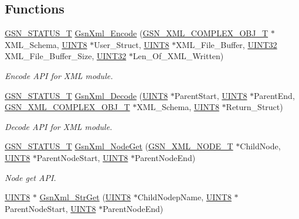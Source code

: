\subsection*{Functions}
\begin{DoxyCompactItemize}
\item 
\hyperlink{a00659_gae36517c0f5872426a7034c9551eb96ac}{GSN\_\-STATUS\_\-T} \hyperlink{a00679_ga63f420980b051030cf42aba37139d27c}{GsnXml\_\-Encode} (\hyperlink{a00430}{GSN\_\-XML\_\-COMPLEX\_\-OBJ\_\-T} $\ast$XML\_\-Schema, \hyperlink{a00660_gab27e9918b538ce9d8ca692479b375b6a}{UINT8} $\ast$User\_\-Struct, \hyperlink{a00660_gab27e9918b538ce9d8ca692479b375b6a}{UINT8} $\ast$XML\_\-File\_\-Buffer, \hyperlink{a00660_gae1e6edbbc26d6fbc71a90190d0266018}{UINT32} XML\_\-File\_\-Buffer\_\-Size, \hyperlink{a00660_gae1e6edbbc26d6fbc71a90190d0266018}{UINT32} $\ast$Len\_\-Of\_\-XML\_\-Written)
\begin{DoxyCompactList}\small\item\em Encode API for XML module. \end{DoxyCompactList}\item 
\hyperlink{a00659_gae36517c0f5872426a7034c9551eb96ac}{GSN\_\-STATUS\_\-T} \hyperlink{a00679_ga47406fd5baaf0dff016d539afa016b0c}{GsnXml\_\-Decode} (\hyperlink{a00660_gab27e9918b538ce9d8ca692479b375b6a}{UINT8} $\ast$ParentStart, \hyperlink{a00660_gab27e9918b538ce9d8ca692479b375b6a}{UINT8} $\ast$ParentEnd, \hyperlink{a00430}{GSN\_\-XML\_\-COMPLEX\_\-OBJ\_\-T} $\ast$XML\_\-Schema, \hyperlink{a00660_gab27e9918b538ce9d8ca692479b375b6a}{UINT8} $\ast$Return\_\-Struct)
\begin{DoxyCompactList}\small\item\em Decode API for XML module. \end{DoxyCompactList}\item 
\hyperlink{a00659_gae36517c0f5872426a7034c9551eb96ac}{GSN\_\-STATUS\_\-T} \hyperlink{a00679_ga8617ee56599bff50a73b55c1d04919a5}{GsnXml\_\-NodeGet} (\hyperlink{a00434}{GSN\_\-XML\_\-NODE\_\-T} $\ast$ChildNode, \hyperlink{a00660_gab27e9918b538ce9d8ca692479b375b6a}{UINT8} $\ast$ParentNodeStart, \hyperlink{a00660_gab27e9918b538ce9d8ca692479b375b6a}{UINT8} $\ast$ParentNodeEnd)
\begin{DoxyCompactList}\small\item\em Node get API. \end{DoxyCompactList}\item 
\hyperlink{a00660_gab27e9918b538ce9d8ca692479b375b6a}{UINT8} $\ast$ \hyperlink{a00616_a09e3a24a2a4f90e105d7511072b9192c}{GsnXml\_\-StrGet} (\hyperlink{a00660_gab27e9918b538ce9d8ca692479b375b6a}{UINT8} $\ast$ChildNodepName, \hyperlink{a00660_gab27e9918b538ce9d8ca692479b375b6a}{UINT8} $\ast$ParentNodeStart, \hyperlink{a00660_gab27e9918b538ce9d8ca692479b375b6a}{UINT8} $\ast$ParentNodeEnd)

\end{DoxyCompactItemize}
